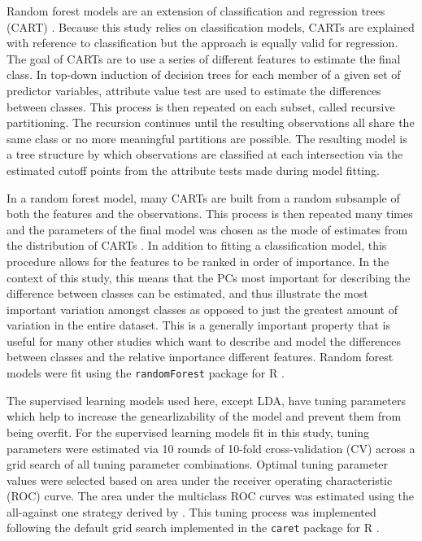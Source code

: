 \documentclass[12pt,letterpaper]{article}\usepackage{graphicx, color}
\begin{document}
Random forest models are an extension of classification and regression trees (CART) \citep{Breiman1984,Breiman2001}. Because this study relies on classification models, CARTs are explained with reference to classification but the approach is equally valid for regression. The goal of CARTs are to use a series of different features to estimate the final class. In top-down induction of decision trees for each member of a given set of predictor variables, attribute value test are used to estimate the differences between classes. This process is then repeated on each subset, called recursive partitioning. The recursion continues until the resulting observations all share the same class or no more meaningful partitions are possible. The resulting model is a tree structure by which observations are classified at each intersection via the estimated cutoff points from the attribute tests made during model fitting.

In a random forest model, many CARTs are built from a random subsample of both the features and the observations. This process is then repeated many times and the parameters of the final model was chosen as the mode of estimates from the distribution of CARTs \citep{Breiman2001}. In addition to fitting a classification model, this procedure allows for the features to be ranked in order of importance. In the context of this study, this means that the PCs most important for describing the difference between classes can be estimated, and thus illustrate the most important variation amongst classes as opposed to just the greatest amount of variation in the entire dataset. This is a generally important property that is useful for many other studies which want to describe and model the differences between classes and the relative importance different features. Random forest models were fit using the \texttt{randomForest} package for R \citep{Liaw2002}.


The supervised learning models used here, except LDA, have tuning parameters which help to increase the genearlizability of the model and prevent them from being overfit. For the supervised learning models fit in this study, tuning parameters were estimated via 10 rounds of 10-fold cross-validation (CV) across a grid search of all tuning parameter combinations. Optimal tuning parameter values were selected based on area under the receiver operating characteristic (ROC) curve. The area under the multiclass ROC curves was estimated using the all-against one strategy derived by \citet{Hand2001}. This tuning process was implemented following the default grid search implemented in the \texttt{caret} package for R \citep{Kuhn2013}.
\end{document}
